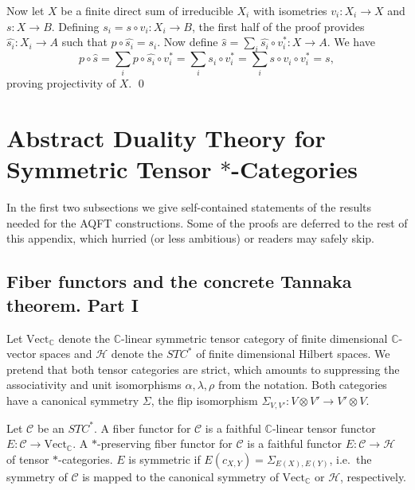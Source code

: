 \documentclass[11pt]{article}
\theoremstyle{definition}
\theoremstyle{definition}
\theoremstyle{remark}
\newcommand{\Vect}{\mathrm{Vect}}
\def\2#1{{\mathcal #1}}
\def\7#1{{\mathbb #1}}
\newcommand{\rarr}{\rightarrow}
\begin{document}
Now let $X$ be a finite direct sum of irreducible $X_i$ with isometries $v_i:X_i\rarr X$ and $s:X\rarr B$.
Defining $s_i=s\circ v_i:X_i\rarr B$, the first half of the proof provides $\widehat{s_i}:X_i\rarr A$
such that $p\circ\widehat{s_i}=s_i$. Now define $\widehat{s}=\sum_i \widehat{s_i}\circ v_i^*:X\rarr A$.
We have 
\[ p\circ\widehat{s}=\sum_i p\circ\widehat{s_i}\circ v_i^*=\sum_i s_i\circ v_i^* 
   =\sum_i s\circ v_i\circ v_i^* = s, \]
proving projectivity of $X$.
\qed










\section{Abstract Duality Theory for Symmetric Tensor $*$-Categories} \label{App-B}
In the first two subsections we give self-contained statements of the results needed for the AQFT
constructions. Some of the proofs are deferred to the rest of this appendix, which hurried (or less
ambitious) or readers may safely skip. 

\subsection{Fiber functors and the concrete Tannaka theorem. Part I} \label{ss-concrete1}
Let $\Vect_\7C$ denote the $\7C$-linear symmetric tensor category of finite dimensional $\7C$-vector
spaces and $\2H$ denote the $STC^*$ of finite dimensional Hilbert spaces. We pretend that both
tensor categories are strict, which amounts to suppressing the associativity and unit isomorphisms
$\alpha,\lambda,\rho$ from the notation. Both categories have a canonical symmetry $\Sigma$, the
flip isomorphism $\Sigma_{V,V'}: V\otimes V'\rarr V'\otimes V$.  

\bdefin {}
Let $\2C$ be an $STC^*$. A fiber functor for $\2C$ is a faithful $\7C$-linear tensor functor
$E:\2C\rarr\Vect_\7C$. A $*$-preserving fiber functor for $\2C$ is a faithful functor $E: \2C\rarr\2H$
of tensor $*$-categories. $E$ is symmetric if $E(c_{X,Y})=\Sigma_{E(X),E(Y)}$, i.e.\ the symmetry of  
$\2C$ is mapped to the canonical symmetry of $\Vect_\7C$ or $\2H$, respectively.
\edefin
\end{document}
